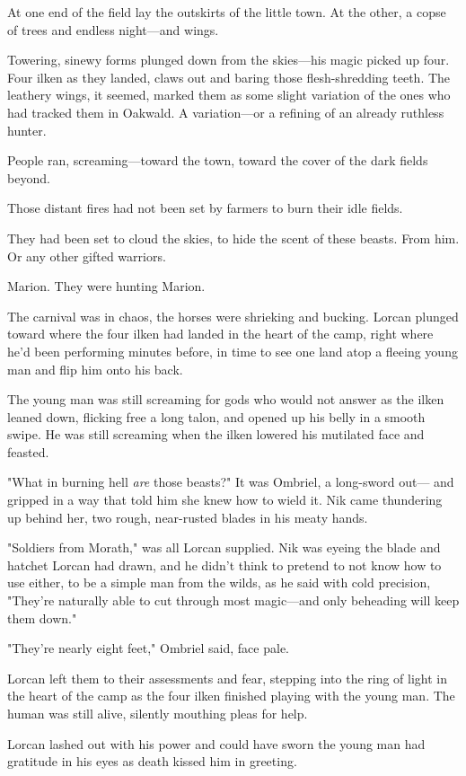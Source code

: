 At one end of the field lay the outskirts of the little town.
At the other, a copse of trees and endless night---and wings.

Towering, sinewy forms plunged down from the skies---his magic picked up four.
Four ilken as they landed, claws out and baring those flesh-shredding teeth.
The leathery wings, it seemed, marked them as some slight variation of the ones who had tracked them in Oakwald.
A variation---or a refining of an already ruthless hunter.

People ran, screaming---toward the town, toward the cover of the dark fields beyond.

Those distant fires had not been set by farmers to burn their idle fields.

They had been set to cloud the skies, to hide the scent of these beasts.
From him.
Or any other gifted warriors.

Marion.
They were hunting Marion.

The carnival was in chaos, the horses were shrieking and bucking.
Lorcan plunged toward where the four ilken had landed in the heart of the camp, right where he'd been performing minutes before, in time to see one land atop a fleeing young man and flip him onto his back.

The young man was still screaming for gods who would not answer as the ilken leaned down, flicking free a long talon, and opened up his belly in a smooth swipe.
He was still screaming when the ilken lowered his mutilated face and feasted.

"What in burning hell \emph{are} those beasts?"
It was Ombriel, a long-sword out--- and gripped in a way that told him she knew how to wield it.
Nik came thundering up behind her, two rough, near-rusted blades in his meaty hands.

"Soldiers from Morath," was all Lorcan supplied.
Nik was eyeing the blade and hatchet Lorcan had drawn, and he didn't think to pretend to not know how to use either, to be a simple man from the wilds, as he said with cold precision, "They're naturally able to cut through most magic---and only beheading will keep them down."

"They're nearly eight feet," Ombriel said, face pale.

Lorcan left them to their assessments and fear, stepping into the ring of light in the heart of the camp as the four ilken finished playing with the young man.
The human was still alive, silently mouthing pleas for help.

Lorcan lashed out with his power and could have sworn the young man had gratitude in his eyes as death kissed him in greeting.

